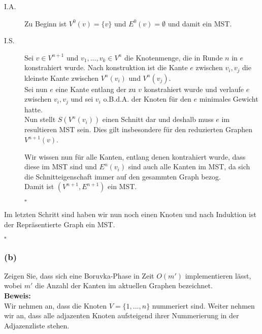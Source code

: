 \documentclass[11pt,a4paper,ngerman]{article}
\begin{document}
\begin{description}
    \item[I.A.] Zu Beginn ist $V^0(v) = \{ v \}$ und $E^0(v) = \emptyset$
        und damit ein MST.\\
    \item[I.S.] Sei $v \in V^{n+1}$ und $v_1, ..., v_k \in V^n$ die 
        Knotenmenge, die in Runde $n$ in $e$ konstrahiert wurde.
        Nach konstruktion ist die Kante $e$ zwischen $v_i, v_j$
        die kleinste Kante zwischen $V^n(v_i)$ und $V^n(v_j)$.\\

        Sei nun $e$ eine Kante entlang der zu $v$ konstrahiert wurde
        und verlaufe $e$ zwischen $v_i, v_j$ und sei $v_i$ o.B.d.A.
        der Knoten für den $e$ minimales Gewicht hatte.\\

        Nun stellt $S(V^{n}(v_i))$ einen Schnitt dar und deshalb
        muss $e$ im resultieren MST sein. Dies gilt insbesondere
        für den reduzierten Graphen $V^{n+1}(v)$.

        Wir wissen nun für alle Kanten, entlang denen kontrahiert wurde,
        dass diese im MST sind und $E^{n}(v_i)$ sind auch alle Kanten
        im MST, da sich die Schnitteigenschaft immer auf den gesammten
        Graph bezog.\\

        Damit ist $(V^{n+1}, E^{n+1})$ ein MST.

        \mbox{}\hfill$\square$
\end{description}

        Im letzten Schritt sind haben wir nun noch einen Knoten
        und nach Induktion ist der Repräsentierte Graph ein MST.
    
        \mbox{}\hfill$\square$
\subsubsection*{(b)}

Zeigen Sie, dass sich eine Boruvka-Phase in Zeit $O(m')$ implementieren lässt,
wobei $m'$ die Anzahl der Kanten im aktuellen Graphen bezeichnet.\\

\textbf{Beweis:}\\
Wir nehmen an, dass die Knoten $V = \{1, ..., n \}$ nummeriert sind.
Weiter nehmen  wir an, dass alle adjazenten Knoten aufsteigend
ihrer Nummerierung in der Adjazenzliste stehen.\\
\end{document}
